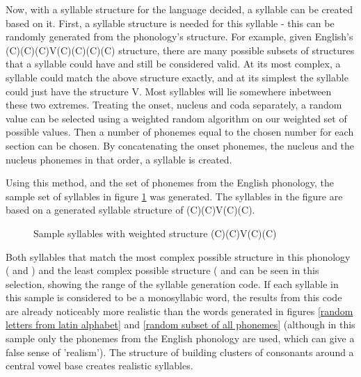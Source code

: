 \documentclass{report}
\begin{document}
	Now, with a syllable structure for the language decided, a syllable can be created based on it. First, a syllable structure is needed for this syllable - this can be randomly generated from the phonology's structure. For example, given English's (C)(C)(C)V(C)(C)(C)(C) structure, there are many possible subsets of structures that a syllable could have and still be considered valid. At its most complex, a syllable could match the above structure exactly, and at its simplest the syllable could just have the structure V. Most syllables will lie somewhere inbetween these two extremes. Treating the onset, nucleus and coda separately, a random value can be selected using a weighted random algorithm on our weighted set of possible values. Then a number of phonemes equal to the chosen number for each section can be chosen. By concatenating the onset phonemes, the nucleus and the nucleus phonemes in that order, a syllable is created.
	
	Using this method, and the set of phonemes from the English phonology, the sample set of syllables in figure \ref{sample syllables with weighted structure} was generated. The syllables in the figure are based on a generated syllable structure of (C)(C)V(C)(C).
	
	\begin{figure}
		\caption{Sample syllables with weighted structure (C)(C)V(C)(C)}
		\label{sample syllables with weighted structure}  
		\begin{tcolorbox}
		\end{tcolorbox}
	\end{figure}

	Both syllables that match the most complex possible structure in this phonology ( and ) and the least complex possible structure ( and  can be seen in this selection, showing the range of the syllable generation code. If each syllable in this sample is considered to be a monosyllabic word, the results from this code are already noticeably more realistic than the words generated in figures \ref{random letters from latin alphabet} and \ref{random subset of all phonemes} (although in this sample only the phonemes from the English phonology are used, which can give a false sense of 'realism'). The structure of building clusters of consonants around a central vowel base creates realistic syllables.
	
\end{document}
